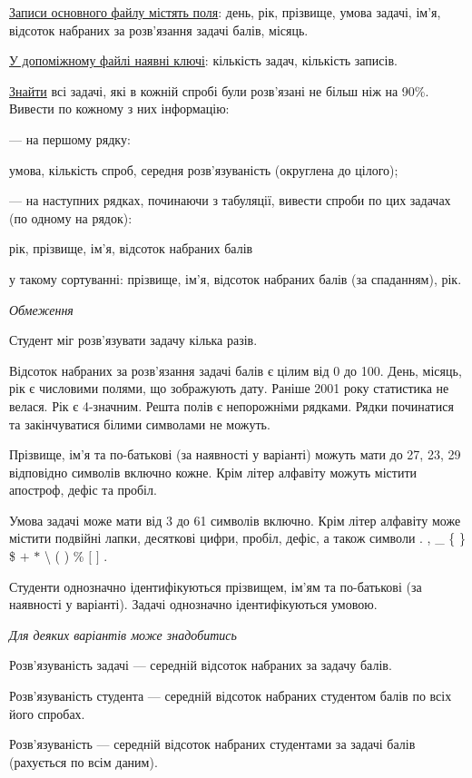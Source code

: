 \documentclass[11pt, ukrainian]{article}
\begin{document}
\underline{Записи основного файлу містять поля}: день, рік, прізвище, умова задачі, ім’я, відсоток набраних за розв’язання задачі балів, місяць.

\underline{У допоміжному файлі наявні ключі}: кількість задач, кількість записів.

\underline{Знайти} всі задачі, які в кожній спробі були розв’язані не більш ніж на 90\%. Вивести по кожному з них інформацію:\par
{\noindent}--- на першому рядку:\par
умова, кількість спроб, середня розв’язуваність (округлена до цілого);

{\noindent}--- на наступних рядках, починаючи з табуляції, вивести спроби по цих задачах (по одному на рядок):\par
рік, прізвище, ім’я, відсоток набраних балів

{\noindent}у такому сортуванні: прізвище, ім’я, відсоток набраних балів (за спаданням), рік.


\bigskip\textit{Обмеження}

Студент міг розв’язувати задачу кілька разів.

Відсоток набраних за розв’язання задачі балів є цілим від 0 до 100.
День, місяць, рік є числовими полями, що зображують дату.
Раніше 2001 року статистика не велася. Рік є 4-значним.
Решта полів є непорожніми рядками.
Рядки починатися та закінчуватися білими символами не можуть.

Прізвище, ім’я та по-батькові (за наявності у варіанті) можуть мати до 27, 23, 29 відповідно символів включно кожне. 
Крім літер алфавіту можуть містити апостроф, дефіс та пробіл.

Умова задачі може мати від 3 до 61 символів включно.
Крім літер алфавіту може містити подвійні лапки, десяткові цифри, пробіл, дефіс,
а також символи . , \_ \{ \} \$ $+$ $*$ {\textbackslash} ( ) \% $[$ $]$ .

Студенти однозначно ідентифікуються прізвищем, ім’ям та по-батькові (за наявності у варіанті).
Задачі однозначно ідентифікуються умовою.

\bigskip\textit{Для деяких варіантів може знадобитись}

Розв'язуваність задачі --- середній відсоток набраних за задачу балів.

Розв'язуваність студента --- середній відсоток набраних студентом балів по всіх його спробах.

Розв'язуваність --- середній відсоток набраних студентами за задачі балів (рахується по всім даним).
\end{document}
